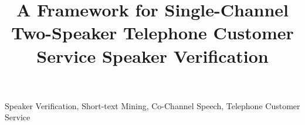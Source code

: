 \documentclass[a4paper,conference]{IEEEtran}
\begin{document}
\title{A Framework for Single-Channel Two-Speaker Telephone Customer Service Speaker Verification}
\author{
}

\maketitle


\begin{IEEEkeywords}
    Speaker Verification, Short-text Mining, Co-Channel Speech, Telephone Customer Service
\end{IEEEkeywords}






\tiny


\end{document}
